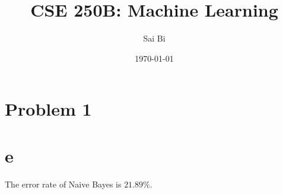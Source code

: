 \documentclass[a4paper,11pt]{article}
\theoremstyle{mytheor}
\begin{document}
\title{CSE 250B: Machine Learning}

\author{Sai Bi}

\date{\today}

\maketitle

\section*{Problem 1}

\section*{e}
The error rate of Naive Bayes is $21.89\%$.
\end{document}
